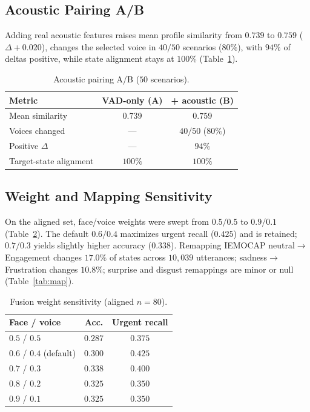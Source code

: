 \documentclass[conference]{IEEEtran}
\begin{document}
\subsection{Acoustic Pairing A/B}
Adding real acoustic features raises mean profile similarity from $0.739$ to
$0.759$ ($\Delta{+}0.020$), changes the selected voice in $40/50$ scenarios
($80\%$), with $94\%$ of deltas positive, while state alignment stays at
$100\%$ (Table~\ref{tab:ab}).

\begin{table}[!t]
\caption{Acoustic pairing A/B ($50$ scenarios).}
\label{tab:ab}
\centering
\begin{tabular}{@{}lcc@{}}
\toprule
\textbf{Metric} & \textbf{VAD-only (A)} & \textbf{+ acoustic (B)} \\
\midrule
Mean similarity & $0.739$ & $\mathbf{0.759}$ \\
Voices changed & --- & $40/50$ ($80\%$) \\
Positive $\Delta$ & --- & $94\%$ \\
Target-state alignment & $100\%$ & $100\%$ \\
\bottomrule
\end{tabular}
\end{table}

\subsection{Weight and Mapping Sensitivity}
On the aligned set, face/voice weights were swept from $0.5/0.5$ to $0.9/0.1$
(Table~\ref{tab:weights}). The default $0.6/0.4$ maximizes urgent recall
($0.425$) and is retained; $0.7/0.3$ yields slightly higher accuracy
($0.338$). Remapping IEMOCAP neutral$\rightarrow$Engagement changes $17.0\%$
of states across $10{,}039$ utterances; sadness$\rightarrow$Frustration
changes $10.8\%$; surprise and disgust remappings are minor or null
(Table~\ref{tab:map}).

\begin{table}[!t]
\caption{Fusion weight sensitivity (aligned $n{=}80$).}
\label{tab:weights}
\centering
\begin{tabular}{@{}lcc@{}}
\toprule
\textbf{Face / voice} & \textbf{Acc.} & \textbf{Urgent recall} \\
\midrule
$0.5$ / $0.5$ & $0.287$ & $0.375$ \\
$\mathbf{0.6}$ / $\mathbf{0.4}$ (default) & $0.300$ & $\mathbf{0.425}$ \\
$0.7$ / $0.3$ & $\mathbf{0.338}$ & $0.400$ \\
$0.8$ / $0.2$ & $0.325$ & $0.350$ \\
$0.9$ / $0.1$ & $0.325$ & $0.350$ \\
\bottomrule
\end{tabular}
\end{table}
\end{document}
